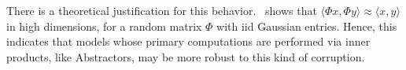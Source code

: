 There is a theoretical justification for this behavior.~\cite{zhouCompressedPrivacySensitive2009} shows that $\langle \Phi x, \Phi y \rangle \approx \langle x, y \rangle$ in high dimensions, for a random matrix $\Phi$ with iid Gaussian entries. Hence, this indicates that models whose primary computations are performed via inner products, like Abstractors, may be more robust to this kind of corruption.

